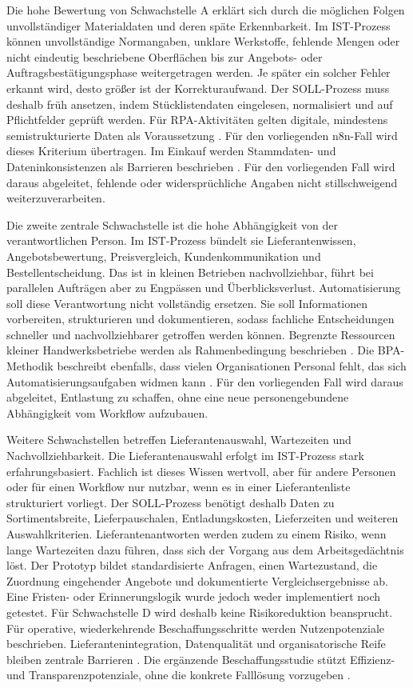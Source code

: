 \documentclass[a4paper,12pt]{article}
\begin{document}
Die hohe Bewertung von Schwachstelle A erklärt sich durch die möglichen Folgen unvollständiger Materialdaten und deren späte Erkennbarkeit. Im IST-Prozess können unvollständige Normangaben, unklare Werkstoffe, fehlende Mengen oder nicht eindeutig beschriebene Oberflächen bis zur Angebots- oder Auftragsbestätigungsphase weitergetragen werden. Je später ein solcher Fehler erkannt wird, desto größer ist der Korrekturaufwand. Der SOLL-Prozess muss deshalb früh ansetzen, indem Stücklistendaten eingelesen, normalisiert und auf Pflichtfelder geprüft werden. Für RPA-Aktivitäten gelten digitale, mindestens semistrukturierte Daten als Voraussetzung \parencite{wellmann_framework_2020}. Für den vorliegenden n8n-Fall wird dieses Kriterium übertragen. Im Einkauf werden Stammdaten- und Dateninkonsistenzen als Barrieren beschrieben \parencite{flechsig_robotic_2022}. Für den vorliegenden Fall wird daraus abgeleitet, fehlende oder widersprüchliche Angaben nicht stillschweigend weiterzuverarbeiten.

Die zweite zentrale Schwachstelle ist die hohe Abhängigkeit von der verantwortlichen Person. Im IST-Prozess bündelt sie Lieferantenwissen, Angebotsbewertung, Preisvergleich, Kundenkommunikation und Bestellentscheidung. Das ist in kleinen Betrieben nachvollziehbar, führt bei parallelen Aufträgen aber zu Engpässen und Überblicksverlust. Automatisierung soll diese Verantwortung nicht vollständig ersetzen. Sie soll Informationen vorbereiten, strukturieren und dokumentieren, sodass fachliche Entscheidungen schneller und nachvollziehbarer getroffen werden können. Begrenzte Ressourcen kleiner Handwerksbetriebe werden als Rahmenbedingung beschrieben \parencite{beuchel_digitalisierung_2024}. Die BPA-Methodik beschreibt ebenfalls, dass vielen Organisationen Personal fehlt, das sich Automatisierungsaufgaben widmen kann \parencite{moreira_methodology_2025}. Für den vorliegenden Fall wird daraus abgeleitet, Entlastung zu schaffen, ohne eine neue personengebundene Abhängigkeit vom Workflow aufzubauen.

Weitere Schwachstellen betreffen Lieferantenauswahl, Wartezeiten und Nachvollziehbarkeit. Die Lieferantenauswahl erfolgt im IST-Prozess stark erfahrungsbasiert. Fachlich ist dieses Wissen wertvoll, aber für andere Personen oder für einen Workflow nur nutzbar, wenn es in einer Lieferantenliste strukturiert vorliegt. Der SOLL-Prozess benötigt deshalb Daten zu Sortimentsbreite, Lieferpauschalen, Entladungskosten, Lieferzeiten und weiteren Auswahlkriterien. Lieferantenantworten werden zudem zu einem Risiko, wenn lange Wartezeiten dazu führen, dass sich der Vorgang aus dem Arbeitsgedächtnis löst. Der Prototyp bildet standardisierte Anfragen, einen Wartezustand, die Zuordnung eingehender Angebote und dokumentierte Vergleichsergebnisse ab. Eine Fristen- oder Erinnerungslogik wurde jedoch weder implementiert noch getestet. Für Schwachstelle D wird deshalb keine Risikoreduktion beansprucht. Für operative, wiederkehrende Beschaffungsschritte werden Nutzenpotenziale beschrieben. Lieferantenintegration, Datenqualität und organisatorische Reife bleiben zentrale Barrieren \parencite{flechsig_robotic_2022}. Die ergänzende Beschaffungsstudie stützt Effizienz- und Transparenzpotenziale, ohne die konkrete Falllösung vorzugeben \parencite{santos_rebooting_2025}.
\end{document}
